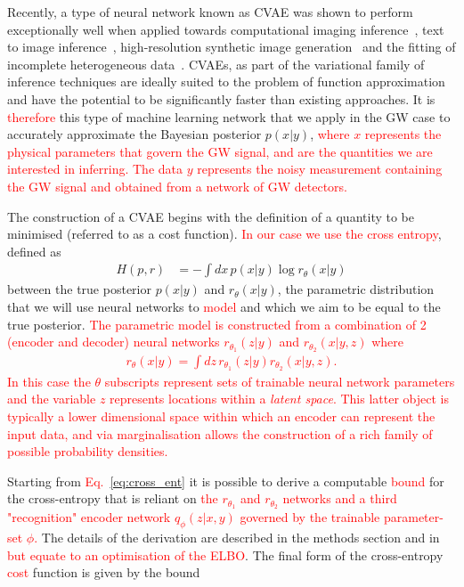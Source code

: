 \documentclass[%
showpacs,
nofootinbib,
 amsmath,amssymb,
 aps,
 twocolumn,
 prl,
 reprint,
floatfix,
]{revtex4-1}
\newcommand{\new}[1]{\textcolor{red}{#1}}
\begin{document}
%
%
Recently, a type of neural network known as \ac{CVAE} was shown to perform
exceptionally well when applied towards computational imaging
inference~\cite{1904.06264,NIPS2015_5775}, text to image
inference~\cite{1512.00570}, high-resolution synthetic image
generation~\cite{1612.00005} and the fitting of incomplete heterogeneous
data~\cite{1807.03653}. \acp{CVAE}, as part of the variational family of
inference techniques are ideally suited to the problem of function
approximation and have the potential to be significantly faster than existing
approaches. It is \new{therefore} this type of machine learning network that we
apply in the \ac{GW} case to accurately approximate the Bayesian posterior
$p(x|y)$, \new{where $x$ represents the physical parameters that govern the
\ac{GW} signal, and are the quantities we are interested in inferring. The data
$y$ represents the noisy measurement containing the \ac{GW} signal and obtained
from a network of \ac{GW} detectors.} 

%
%
The construction of a \ac{CVAE} begins with the definition of a quantity to be
minimised (referred to as a cost function). \new{In our case we use the cross
entropy}, defined as
%
\begin{align}\label{eq:cross_ent} 
H(p,r) &= -\int dx\, p(x|y) \log r_{\theta}(x|y) 
\end{align}
%
between the true posterior $p(x|y)$ and $r_{\theta}(x|y)$, the parametric
distribution that we will use neural networks to \new{model} and which we aim
to be equal to the true posterior. \new{The parametric model is
constructed from a combination of 2 (encoder and decoder) neural networks
$r_{\theta_1}(z|y)$ and $r_{\theta_2}(x|y,z)$ where
%
\begin{align}\label{eq:latent_model}
r_{\theta}(x|y) = \int dz\,r_{\theta_1}(z|y)r_{\theta_2}(x|y,z).
\end{align}
%
In this case the $\theta$ subscripts represent sets of trainable neural network
parameters and the variable $z$ represents locations within a \emph{latent
space}. This latter object is typically a lower dimensional space within which
an encoder can represent the input data, and via marginalisation allows the
construction of a rich family of possible probability densities.}

Starting from \new{Eq.~\ref{eq:cross_ent}} it is possible to derive a
computable \new{bound} for the cross-entropy that is reliant on \new{the
$r_{\theta_1}$ and $r_{\theta_2}$ networks and a third "recognition" encoder
network $q_{\phi}(z|x,y)$ governed by the trainable parameter-set $\phi$.} The
details of the derivation are described in the methods section and
in~\cite{1904.06264} \new{but equate to an optimisation of the \ac{ELBO}}. The
final form of the cross-entropy \new{cost} function is given by the bound
\end{document}
